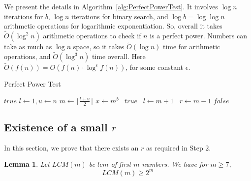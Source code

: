 \documentclass[11pt]{report}
\newtheorem{lemma}[theorem]{Lemma}
\begin{document}
We present the details in Algorithm~\ref{alg:PerfectPowerTest}. It involves $\log n$ iterations for $b$, $\log n$ iterations for binary search, and $\log b = \log \log n$ arithmetic operations for logarithmic exponentiation. So, overall it takes $\tilde O(\log^2 n)$ arithmetic operations to check if $n$ is a perfect power. Numbers can take as much as $\log n$ space, so it takes $\tilde O(\log n)$ time for arithmetic operations, and $\tilde O(\log^3 n)$ time overall. Here $\tilde O(f(n)) = O(f(n) \cdot \log^{\epsilon} f(n))$, for some constant $\epsilon$.

\begin{algorithm}
\caption{Perfect Power Test}
\label{alg:PerfectPowerTest}
\begin{algorithmic}
	\State \Return $true$
\EndIf
{}
	\State $l \gets 1, u \gets n$
		\State $m \gets \lfloor \frac{l+u}{2} \rfloor$
		\State $x \gets m^b$ 
			\ \Return $true$
			\ $l \gets m+1$
		\Else
			\ $r \gets m-1$
		\EndIf
	\EndWhile
\EndFor
\State \Return $false$
\EndProcedure
\end{algorithmic}
\end{algorithm}


\subsection {Existence of a small $r$}
In this section, we prove that there exists an $r$ as required in Step $2$.

\begin{lemma}
\label{lemma:LCMLemma}
Let $LCM(m)$ be $lcm$ of first $m$ numbers. We have for $m \geq 7$,
\[LCM(m) \geq 2^m\]
\end{lemma}
\end{document}
